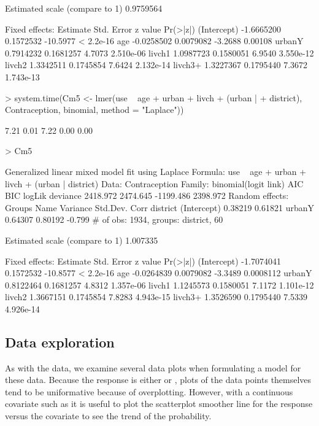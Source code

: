 \documentclass[12pt]{article}
\begin{document}
\begin{Schunk}
\begin{Soutput}
Estimated scale (compare to 1)  0.9759564 

Fixed effects:
              Estimate Std. Error  z value  Pr(>|z|)
(Intercept) -1.6665200  0.1572532 -10.5977 < 2.2e-16
age         -0.0258502  0.0079082  -3.2688   0.00108
urbanY       0.7914232  0.1681257   4.7073 2.510e-06
livch1       1.0987723  0.1580051   6.9540 3.550e-12
livch2       1.3342511  0.1745854   7.6424 2.132e-14
livch3+      1.3227367  0.1795440   7.3672 1.743e-13
\end{Soutput}
\begin{Sinput}
> system.time(Cm5 <- lmer(use ~ age + urban + livch + (urban | 
+     district), Contraception, binomial, method = "Laplace"))
\end{Sinput}
\begin{Soutput}
[1] 7.21 0.01 7.22 0.00 0.00
\end{Soutput}
\begin{Sinput}
> Cm5
\end{Sinput}
\begin{Soutput}
Generalized linear mixed model fit using Laplace 
Formula: use ~ age + urban + livch + (urban | district) 
   Data: Contraception 
 Family: binomial(logit link)
      AIC      BIC    logLik deviance
 2418.972 2474.645 -1199.486 2398.972
Random effects:
 Groups   Name        Variance Std.Dev. Corr   
 district (Intercept) 0.38219  0.61821         
          urbanY      0.64307  0.80192  -0.799 
# of obs: 1934, groups: district, 60

Estimated scale (compare to 1)  1.007335 

Fixed effects:
              Estimate Std. Error  z value  Pr(>|z|)
(Intercept) -1.7074041  0.1572532 -10.8577 < 2.2e-16
age         -0.0264839  0.0079082  -3.3489 0.0008112
urbanY       0.8122464  0.1681257   4.8312 1.357e-06
livch1       1.1245573  0.1580051   7.1172 1.101e-12
livch2       1.3667151  0.1745854   7.8283 4.943e-15
livch3+      1.3526590  0.1795440   7.5339 4.926e-14
\end{Soutput}
\end{Schunk}


\subsection{Data exploration}
\label{sec:ContraExplor}

As with the  data, we examine several data plots when
formulating a model for these data.  Because the response is either
 or , plots of the data points themselves tend to
be uniformative because of overplotting.  However, with a continuous
covariate such as  it is useful to plot the scatterplot
smoother line for the response versus the covariate to see the trend
of the probability.  
\end{document}
